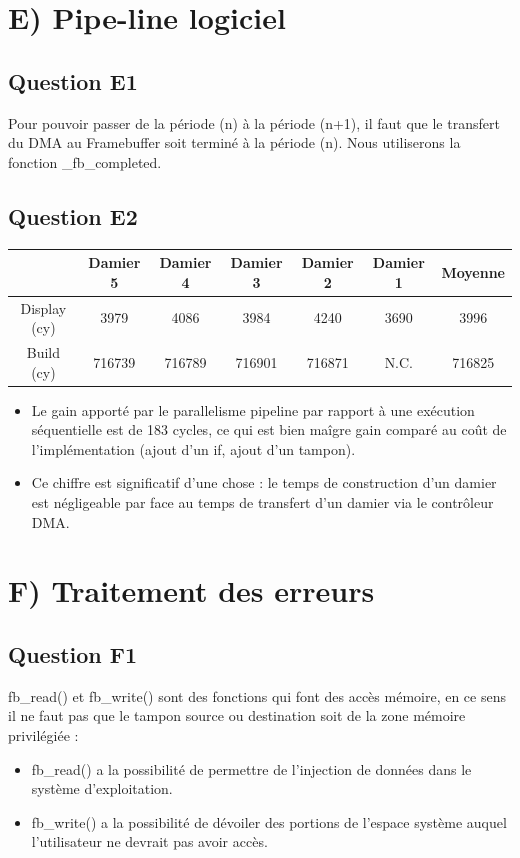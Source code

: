 \documentclass[10pt]{article}
\begin{document}
\section{E) Pipe-line logiciel}

\subsection{Question E1}
Pour pouvoir passer de la période (n) à la période (n+1), il faut que le
transfert du DMA au Framebuffer soit terminé à la période (n). Nous utiliserons
la fonction \_fb\_completed.

\subsection{Question E2}
\begin{center}
  \begin{tabular}{|c|c|c|c|c|c|c|}
    \hline
     & Damier 5 & Damier 4 & Damier 3 & Damier 2 & Damier 1 & Moyenne \\ \hline
     Display (cy) & 3979 & 4086 & 3984 & 4240 & 3690 & 3996 \\ \hline
     Build (cy) & 716739 & 716789 & 716901 & 716871 & N.C. & 716825 \\ \hline
  \end{tabular}
\end{center}

\begin{itemize}
  \item Le gain apporté par le parallelisme pipeline par rapport à une
  exécution séquentielle est de 183 cycles, ce qui est bien maîgre gain
  comparé au coût de l'implémentation (ajout d'un if, ajout d'un tampon).
  \item Ce chiffre est significatif d'une chose : le temps de construction d'un
  damier est négligeable par face au temps de transfert d'un damier via le
  contrôleur DMA.
\end{itemize}

\section{F) Traitement des erreurs}

\subsection{Question F1}
fb\_read() et fb\_write() sont des fonctions qui font des accès mémoire, en ce
sens il ne faut pas que le tampon source ou destination soit de la zone mémoire
privilégiée :
\begin{itemize}
  \item fb\_read() a la possibilité de permettre de l'injection de données dans
  le système d'exploitation.
  \item fb\_write() a la possibilité de dévoiler des portions de l'espace
  système auquel l'utilisateur ne devrait pas avoir accès.
\end{itemize}
\end{document}
